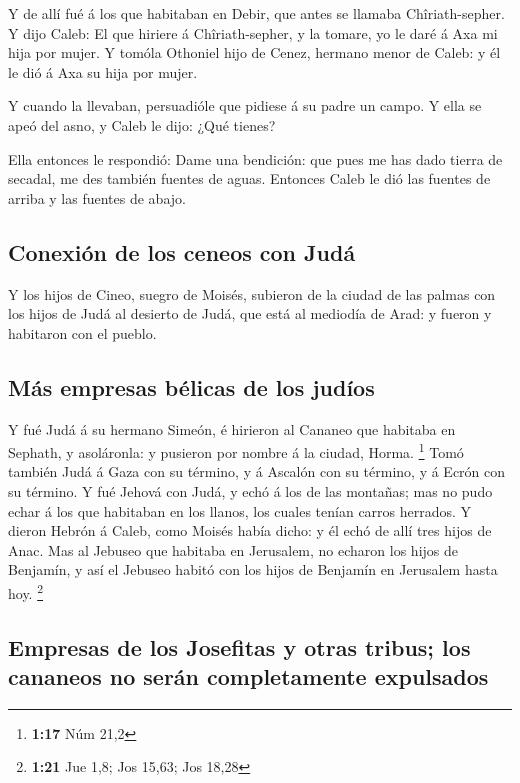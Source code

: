  Y de allí fué á los que habitaban en Debir, que antes se
llamaba Chîriath-sepher.  Y dijo Caleb: El que hiriere á
Chîriath-sepher, y la tomare, yo le daré á Axa mi hija por mujer.
 Y tomóla Othoniel hijo de Cenez, hermano menor de Caleb: y
él le dió á Axa su hija por mujer.

 Y cuando la llevaban, persuadióle que pidiese á su padre
un campo. Y ella se apeó del asno, y Caleb le dijo: ¿Qué tienes?

 Ella entonces le respondió: Dame una bendición: que pues
me has dado tierra de secadal, me des también fuentes de aguas. Entonces
Caleb le dió las fuentes de arriba y las fuentes de abajo.

\hypertarget{conexiuxf3n-de-los-ceneos-con-juduxe1}{%
\subsection{Conexión de los ceneos con
Judá}\label{conexiuxf3n-de-los-ceneos-con-juduxe1}}

 Y los hijos de Cineo, suegro de Moisés, subieron de la
ciudad de las palmas con los hijos de Judá al desierto de Judá, que está
al mediodía de Arad: y fueron y habitaron con el pueblo.

\hypertarget{muxe1s-empresas-buxe9licas-de-los-juduxedos}{%
\subsection{Más empresas bélicas de los
judíos}\label{muxe1s-empresas-buxe9licas-de-los-juduxedos}}

 Y fué Judá á su hermano Simeón, é hirieron al Cananeo que
habitaba en Sephath, y asoláronla: y pusieron por nombre á la ciudad,
Horma. \footnote{\textbf{1:17} Núm 21,2}  Tomó también Judá
á Gaza con su término, y á Ascalón con su término, y á Ecrón con su
término.  Y fué Jehová con Judá, y echó á los de las
montañas; mas no pudo echar á los que habitaban en los llanos, los
cuales tenían carros herrados.  Y dieron Hebrón á Caleb,
como Moisés había dicho: y él echó de allí tres hijos de Anac.
 Mas al Jebuseo que habitaba en Jerusalem, no echaron los
hijos de Benjamín, y así el Jebuseo habitó con los hijos de Benjamín en
Jerusalem hasta hoy. \footnote{\textbf{1:21} Jue 1,8; Jos 15,63; Jos
  18,28}

\hypertarget{empresas-de-los-josefitas-y-otras-tribus-los-cananeos-no-seruxe1n-completamente-expulsados}{%
\subsection{Empresas de los Josefitas y otras tribus; los cananeos no
serán completamente
expulsados}\label{empresas-de-los-josefitas-y-otras-tribus-los-cananeos-no-seruxe1n-completamente-expulsados}}

